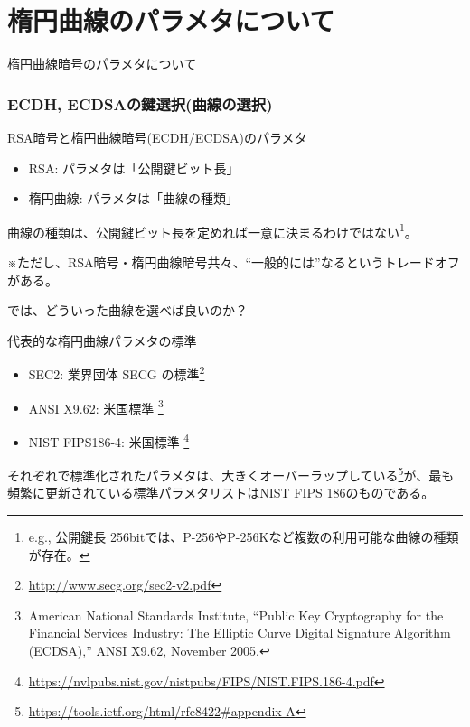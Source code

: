 \documentclass[12pt,dvipdfmx]{beamer}
\begin{document}
\section{楕円曲線のパラメタについて}
\begin{frame}
\centering
{\Large 楕円曲線暗号のパラメタについて}
\end{frame}

\begin{frame}
\frametitle{ECDH, ECDSAの鍵選択(曲線の選択)}
\begin{block}{\small RSA暗号と楕円曲線暗号(ECDH/ECDSA)のパラメタ}
\begin{itemize}
 \item RSA: パラメタは「公開鍵ビット長」
 \item 楕円曲線: パラメタは「曲線の種類」
\end{itemize}
\end{block}
曲線の種類は、公開鍵ビット長を定めれば一意に決まるわけではない\footnote[frame]{\scriptsize e.g., 公開鍵長 256bitでは、P-256やP-256Kなど複数の利用可能な曲線の種類が存在。}。

\begin{alertblock}{}
※ただし、RSA暗号・楕円曲線暗号共々、``一般的には''なるというトレードオフがある。 
\end{alertblock}
\end{frame}

\begin{frame}
では、どういった曲線を選べば良いのか？

\begin{block}{\small 代表的な楕円曲線パラメタの標準}
\begin{itemize}
 \item SEC2: 業界団体 SECG の標準\footnote[frame]{\scriptsize \url{http://www.secg.org/sec2-v2.pdf}}
 \item ANSI X9.62: 米国標準 \footnote[frame]{\scriptsize American National Standards Institute, ``Public Key Cryptography for the Financial Services Industry: The Elliptic Curve Digital Signature Algorithm (ECDSA),'' ANSI X9.62, November 2005.}
 \item NIST FIPS186-4: 米国標準 \footnote[frame]{\scriptsize \url{https://nvlpubs.nist.gov/nistpubs/FIPS/NIST.FIPS.186-4.pdf}}
\end{itemize}
\end{block}
それぞれで標準化されたパラメタは、大きくオーバーラップしている\footnote[frame]{\scriptsize \url{https://tools.ietf.org/html/rfc8422\#appendix-A}}が、\alert{最も頻繁に更新されている標準パラメタリストはNIST FIPS 186}のものである。
\end{frame}
\end{document}
